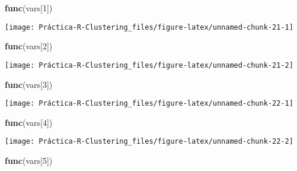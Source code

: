 \documentclass[]{article}
\newenvironment{Shaded}{\begin{snugshade}}{\end{snugshade}}
\newcommand{\DecValTok}[1]{\textcolor[rgb]{0.00,0.00,0.81}{#1}}
\newcommand{\KeywordTok}[1]{\textcolor[rgb]{0.13,0.29,0.53}{\textbf{#1}}}
\newcommand{\NormalTok}[1]{#1}
\begin{document}
\begin{Shaded}
\begin{Highlighting}[]
\KeywordTok{func}\NormalTok{(vars[}\DecValTok{1}\NormalTok{])}
\end{Highlighting}
\end{Shaded}

\begin{center}\texttt{[image: Práctica-R-Clustering\_files/figure-latex/unnamed-chunk-21-1]} \end{center}

\begin{Shaded}
\begin{Highlighting}[]
\KeywordTok{func}\NormalTok{(vars[}\DecValTok{2}\NormalTok{])}
\end{Highlighting}
\end{Shaded}

\begin{center}\texttt{[image: Práctica-R-Clustering\_files/figure-latex/unnamed-chunk-21-2]} \end{center}

\newpage

\begin{Shaded}
\begin{Highlighting}[]
\KeywordTok{func}\NormalTok{(vars[}\DecValTok{3}\NormalTok{])}
\end{Highlighting}
\end{Shaded}

\begin{center}\texttt{[image: Práctica-R-Clustering\_files/figure-latex/unnamed-chunk-22-1]} \end{center}

\begin{Shaded}
\begin{Highlighting}[]
\KeywordTok{func}\NormalTok{(vars[}\DecValTok{4}\NormalTok{])}
\end{Highlighting}
\end{Shaded}

\begin{center}\texttt{[image: Práctica-R-Clustering\_files/figure-latex/unnamed-chunk-22-2]} \end{center}

\newpage

\begin{Shaded}
\begin{Highlighting}[]
\KeywordTok{func}\NormalTok{(vars[}\DecValTok{5}\NormalTok{])}
\end{Highlighting}
\end{Shaded}
\end{document}
